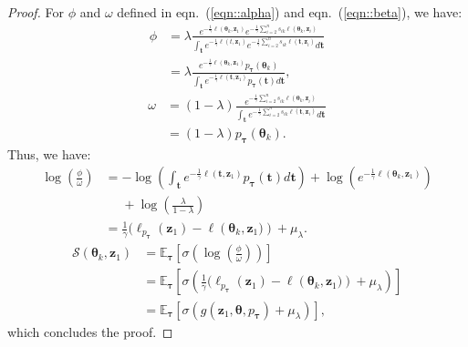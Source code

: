 \documentclass[10pt,journal,compsoc]{IEEEtran}
\begin{document}
\begin{proof}
For $\phi$ and $\omega$ defined in eqn.~(\ref{eqn::alpha}) and eqn.~(\ref{eqn::beta}), we have:
\begin{equation}
\begin{aligned}
\phi  &= \lambda \frac{{{e^{ - \frac{1}{\gamma }\ell ({\bm{\theta}_k},{\bm{z}_1})}}{e^{ - \frac{1}{\gamma }\sum\nolimits_{i = 2}^n {{s_{ik}}\ell ({\bm{\theta}_k},{\bm{z}_i})} }}}}{{\int_{\bm{t}} {{e^{ - \frac{1}{\gamma }\ell (t,{\bm{z}_1})}}{e^{ - \frac{1}{\gamma }\sum\nolimits_{i = 2}^n {{s_{ik}}\ell (\bm{t},{\bm{z}_i})} }}d\bm{t}} }}\\
 &= \lambda \frac{{{e^{ - \frac{1}{\gamma }\ell ({\bm{\theta} _k},{\bm{z}_1})}}{p_{\bm{\tau}} }({\bm{\theta} _k})}}{{\int_{\bm{t}} {{e^{ - \frac{1}{\gamma }\ell (\bm{t},{\bm{z}_1})}}{p_{\bm{\tau}} }(\bm{t})d\bm{t}} }},
\end{aligned}
\end{equation}
\begin{equation}
\begin{aligned}
\omega  &= (1 - \lambda )\frac{{{e^{ - \frac{1}{\gamma }\sum\nolimits_{i = 2}^n {{s_{ik}}\ell ({\bm{\theta}_k},{\bm{z}_i})} }}}}{{\int_{\bm{t}} {{e^{ - \frac{1}{\gamma }\sum\nolimits_{i = 2}^n {{s_{ik}}\ell (\bm{t},{\bm{z}_i})} }}d\bm{t}} }}\\
 &= (1 - \lambda ){p_{\bm{\tau}} }(\bm{\theta}_k).
\end{aligned}
\end{equation}
Thus, we have:
\begin{equation}
\begin{aligned}
    \log \left( {\frac{\phi }{\omega }} \right) &=  - \log \left( {\int_{\bm{t}} {{e^{ - \frac{1}{\gamma }\ell (\bm{t},{\bm{z}_1})}}{p_{\bm{\tau}} }(\bm{t})d\bm{t}} } \right) + \log \left( {{e^{ - \frac{1}{\gamma }\ell ({\bm{\theta}_k},{\bm{z}_1})}}} \right)\\
 &\mathrel{\phantom{=}}+ \log \left( {\frac{\lambda }{{1 - \lambda }}} \right)\\
 &= \frac{1}{\gamma }({\ell _{{p_{\bm{\tau}} }}}({\bm{z}_1}) - \ell \left({\bm{\theta} _k},{\bm{z}_1})\right) + {\mu _\lambda }.
\end{aligned}
\end{equation}
\begin{equation}
\begin{aligned}
    \mathcal{S}({\bm{\theta}_k},{\bm{z}_1}) &= {\mathbb{E}_{\bm{\tau}} }  \left[ { \sigma \left( {\log \left(\frac{\phi }{\omega }\right)} \right) } \right]\\
    &= {\mathbb{E}_{\bm{\tau}} }\left[ { {\sigma} \left(  \frac{1}{\gamma }({\ell _{{p_{\bm{\tau}} }}}({\bm{z}_1}) - \ell \left({\bm{\theta} _k},{\bm{z}_1})\right) + {\mu _\lambda } \right) } \right] \\
    &= {\mathbb{E}_{\bm{\tau}} }\left[ {\sigma \left( {g({\bm{z}_1},\bm{\theta} ,{p_{\bm{\tau}} }) + {\mu _\lambda }} \right)} \right],
\end{aligned}
\end{equation}
which concludes the proof.
\end{proof}
\end{document}
